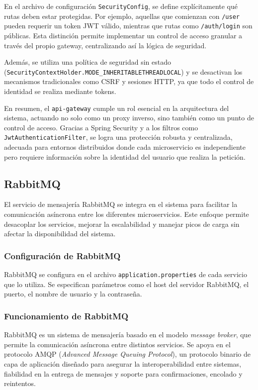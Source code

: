 En el archivo de configuración \texttt{SecurityConfig}, se define explícitamente qué rutas deben estar protegidas. Por ejemplo, aquellas que comienzan con \texttt{/user} pueden requerir un token JWT válido, mientras que rutas como \texttt{/auth/login} son públicas. Esta distinción permite implementar un control de acceso granular a través del propio gateway, centralizando así la lógica de seguridad.

Además, se utiliza una política de seguridad sin estado (\texttt{SecurityContextHolder.MODE\_INHERITABLETHREADLOCAL}) y se desactivan los mecanismos tradicionales como CSRF y sesiones HTTP, ya que todo el control de identidad se realiza mediante tokens.

En resumen, el \texttt{api-gateway} cumple un rol esencial en la arquitectura del sistema, actuando no solo como un proxy inverso, sino también como un punto de control de acceso. Gracias a Spring Security y a los filtros como \texttt{JwtAuthenticationFilter}, se logra una protección robusta y centralizada, adecuada para entornos distribuidos donde cada microservicio es independiente pero requiere información sobre la identidad del usuario que realiza la petición.

\subsection{RabbitMQ}
El servicio de mensajería RabbitMQ se integra en el sistema para facilitar la comunicación asíncrona entre los diferentes microservicios. Este enfoque permite desacoplar los servicios, mejorar la escalabilidad y manejar picos de carga sin afectar la disponibilidad del sistema.
\subsubsection{Configuración de RabbitMQ}
RabbitMQ se configura en el archivo \texttt{application.properties} de cada servicio que lo utiliza. Se especifican parámetros como el host del servidor RabbitMQ, el puerto, el nombre de usuario y la contraseña.
\subsubsection{Funcionamiento de RabbitMQ}

RabbitMQ es un sistema de mensajería basado en el modelo \textit{message broker}, que permite la comunicación asíncrona entre distintos servicios. Se apoya en el protocolo AMQP (\textit{Advanced Message Queuing Protocol}), un protocolo binario de capa de aplicación diseñado para asegurar la interoperabilidad entre sistemas, fiabilidad en la entrega de mensajes y soporte para confirmaciones, encolado y reintentos.

